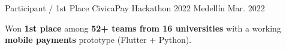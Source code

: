 
\begin{cventries}
  \cventry
  {Participant / 1st Place}
  {CivicaPay Hackathon 2022}
  {Medellín}
  {Mar. 2022}
  {
    \begin{cvitems}
      \item {Won \textbf{1st place} among \textbf{52+ teams from 16 universities} with a working \textbf{mobile payments} prototype (Flutter + Python).}
    \end{cvitems}
  }
\end{cventries}
